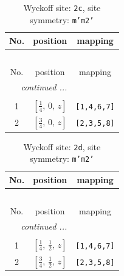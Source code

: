 \documentclass[fleqn,8pt]{jsarticle}
\begin{document}
\begin{longtable}{ccc}
\caption{Wyckoff site: {\tt 2c}, site symmetry: {\tt m'm2'}}
 \\
 \hline \hline
No. & position & mapping \\ \hline \endfirsthead

\multicolumn{2}{l}{\tablename\ \thetable{}} \\
 \hline \hline
No. & position & mapping \\ \hline \endhead

 \hline \hline
\multicolumn{2}{r}{\footnotesize\it continued ...} \\ \endfoot

 \hline \hline
\multicolumn{2}{r}{} \\ \endlastfoot

1 & $\left[ \frac{1}{4},\, 0,\, z \right]$ & {\tt [1,4,6,7]} \\ \hline
2 & $\left[ \frac{3}{4},\, 0,\, z \right]$ & {\tt [2,3,5,8]} \\
\end{longtable}
\renewcommand{\arraystretch}{1.2}
\begin{longtable}{ccc}
\caption{Wyckoff site: {\tt 2d}, site symmetry: {\tt m'm2'}}
 \\
 \hline \hline
No. & position & mapping \\ \hline \endfirsthead

\multicolumn{2}{l}{\tablename\ \thetable{}} \\
 \hline \hline
No. & position & mapping \\ \hline \endhead

 \hline \hline
\multicolumn{2}{r}{\footnotesize\it continued ...} \\ \endfoot

 \hline \hline
\multicolumn{2}{r}{} \\ \endlastfoot

1 & $\left[ \frac{1}{4},\, \frac{1}{2},\, z \right]$ & {\tt [1,4,6,7]} \\ \hline
2 & $\left[ \frac{3}{4},\, \frac{1}{2},\, z \right]$ & {\tt [2,3,5,8]} \\
\end{longtable}
\renewcommand{\arraystretch}{1.2}
\end{document}
